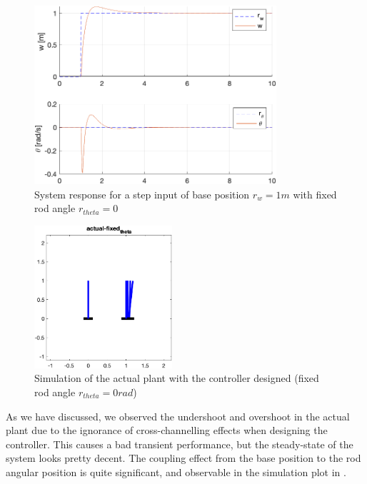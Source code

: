 \documentclass{tron}
\begin{document}
\begin{figure}[H]
	\centering
	\includegraphics[height=250px]{../matlab/output/p5/square_response_actual-fixed_theta}
	\caption{System response for a step input of base position $r_{w}=1\unit{m}$ with fixed rod angle $r_{theta}=0$}
	\label{fig:p5:P3_aug:sim:fixe-theta}
\end{figure}
\begin{figure}[H]
	\centering
	\includegraphics[height=200px]{../matlab/output/p5/mimo_sim_actual-fixed_theta}
	\caption{Simulation of the actual plant with the controller designed (fixed rod angle $r_{theta}=0\unit{rad}$)}
	\label{fig:p5:P3_aug:sim:fixe-theta}
\end{figure}

As we have discussed, we observed the undershoot and overshoot in the actual plant due to the ignorance of cross-channelling effects when designing the controller. This causes a bad transient performance, but the steady-state of the system looks pretty decent. The coupling effect from the base position to the rod angular position is quite significant, and observable in the simulation plot in .
\end{document}
